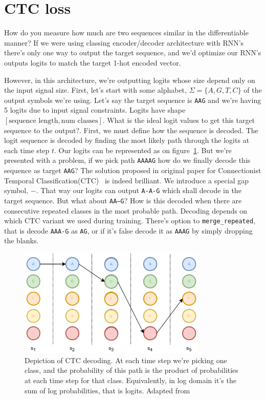 \documentclass[times, utf8, diplomski, english]{fer}
\begin{document}
\section{CTC loss}
\label{sec:ctc_loss}

How do you measure how much are two sequences similar in the differentiable manner? If we were using classing encoder/decoder architecture with RNN's there's only one way to output the target sequence, and we'd optimize our RNN's outputs logits to match the target 1-hot encoded vector. 

However, in this architecture, we're outputting logits whose size depend only on the input signal size. First, let's start with some alphabet, $\Sigma = \{A, G, T, C\}$ of the output symbols we're using.  
Let's say the target sequence is \texttt{AAG} and we're having 5 logits due to input signal constraints. 
Logits have shape $[\text{sequence length}, \text{num classes}]$. 
What is the ideal logit values to get this target sequence to the output?. 
First, we must define how the sequence is decoded. 
The logit sequence is decoded by finding the most likely path through the logits at each time step $t$. Our logits can be represented as on figure~\ref{fg:ctc_graph_0}.
But we're presented with a problem, if we pick path \texttt{AAAAG} how do we finally decode this sequence as target \texttt{AAG}? The solution proposed in original paper for Connectionist Temporal Classification(CTC)~\citep{Graves:2006:CTC:1143844.1143891, ctc-blog} is indeed brilliant. 
We introduce a special gap symbol, $-$. 
That way our logits can output \texttt{A-A-G} which shall decode in the target sequence.
But what about \texttt{AA--G}? How is this decoded when there are consecutive repeated classes in the most probable path. 
Decoding depends on which CTC variant we used during training. There's option to \texttt{merge\_repeated}, that is decode \texttt{AAA-G} as \texttt{AG}, or if it's false decode it as \texttt{AAAG} by simply dropping the blanks. 

\begin{figure}
    \begin{center}
        \includegraphics[width=0.8\textwidth]{ctc_graph_1}
        \caption{Depiction of CTC decoding. At each time step we're picking one class, and the probability of this path is the product of probabilities at each time step for that class. Equivalently, in log domain it's the sum of log probabilities, that is logits. Adapted from~\citep{mratkovic}}
        \label{fg:ctc_graph_0}
    \end{center}
\end{figure}
\end{document}
